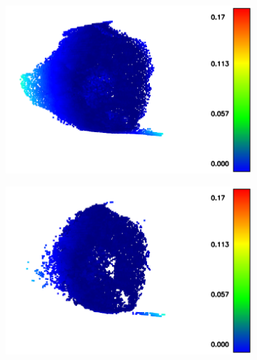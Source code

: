 \begin{figure}[h]
\begin{subfigure}[b]{0.3\textwidth}
		\caption{}
		\label{fig:ball:c}
	\end{subfigure}
	\hfill
	\newline
	\vfill
	\begin{subfigure}[b]{0.3\textwidth}
		\centering
		\includegraphics[width=\textwidth]{figures/ball_sor.png}
		\caption{}
		\label{fig:ball:d}
	\end{subfigure}
	\hfill
	\begin{subfigure}[b]{0.3\textwidth}
		\centering
		\includegraphics[width=\textwidth]{figures/ball_ror.png}
		\caption{}
		\label{fig:ball:e}
	\end{subfigure}
	\hfill
	\begin{subfigure}[b]{0.3\textwidth}
		\centering

\end{subfigure}
\end{figure}
